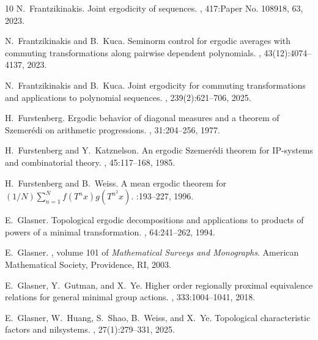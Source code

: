 \documentclass[11pt,reqno]{amsart}
\theoremstyle{definition}
\theoremstyle{remark}
\begin{document}
\begin{thebibliography}{10}
N.~Frantzikinakis.
\newblock Joint ergodicity of sequences.
, 417:Paper No. 108918, 63, 2023.

N.~Frantzikinakis and B.~Kuca.
\newblock Seminorm control for ergodic averages with commuting transformations along pairwise dependent polynomials.
, 43(12):4074--4137, 2023.

N.~Frantzikinakis and B.~Kuca.
\newblock Joint ergodicity for commuting transformations and applications to polynomial sequences.
, 239(2):621--706, 2025.

H.~Furstenberg.
\newblock Ergodic behavior of diagonal measures and a theorem of {S}zemer\'{e}di on arithmetic progressions.
, 31:204--256, 1977.

H.~Furstenberg and Y.~Katznelson.
\newblock An ergodic {S}zemer\'edi theorem for {IP}-systems and combinatorial theory.
, 45:117--168, 1985.

H.~Furstenberg and B.~Weiss.
\newblock A mean ergodic theorem for {$(1/N)\sum^N_{n=1}f(T^nx)g(T^{n^2}x)$}.
:193--227, 1996.

E.~Glasner.
\newblock Topological ergodic decompositions and applications to products of powers of a minimal transformation.
, 64:241--262, 1994.

E.~Glasner.
, volume 101 of {\em Mathematical Surveys and Monographs}.
\newblock American Mathematical Society, Providence, RI, 2003.

E.~Glasner, Y.~Gutman, and X.~Ye.
\newblock Higher order regionally proximal equivalence relations for general minimal group actions.
, 333:1004--1041, 2018.

E.~Glasner, W.~Huang, S.~Shao, B.~Weiss, and X.~Ye.
\newblock Topological characteristic factors and nilsystems.
, 27(1):279--331, 2025.


\end{thebibliography}
\end{document}
